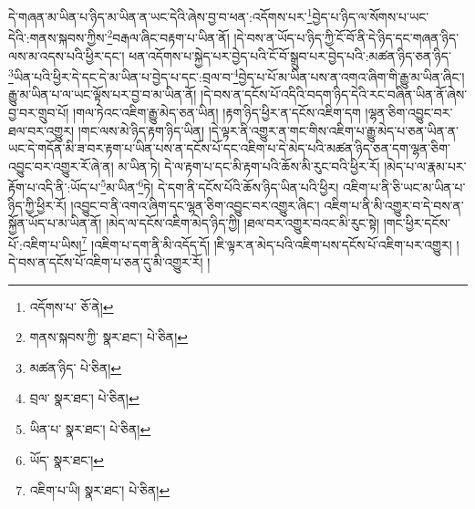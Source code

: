 དེ་གཞན་མ་ཡིན་པ་ཉིད་མ་ཡིན་ན་ཡང་དེའི་ཞེས་བྱ་བ་ཕན་:འདོགས་པར་\footnote{འདོགས་པ་  ཅོ་ནེ། }བྱེད་པ་ཉིད་ལ་སོགས་པ་ཡང་དེའི་:གནས་སྐབས་ཀྱིས་\footnote{གནས་སྐབས་ཀྱི་  སྣར་ཐང་།  པེ་ཅིན། }བརྒལ་ཞིང་བརྟག་པ་ཡིན་ནོ། །དེ་བས་ན་ཡོད་པ་ཉིད་ཀྱི་ངོ་བོ་ནི་དེ་ཉིད་དང་གཞན་ཉིད་ལས་མ་འདས་པའི་ཕྱིར་དང་། ཕན་འདོགས་པ་སྐྱེད་པར་བྱེད་པའི་ངོ་བོ་སྒྲུབ་པར་བྱེད་པའི་:མཚན་ཉིད་ཅན་ཉིད་\footnote{མཚན་ཉིད་  པེ་ཅིན། }ཡིན་པའི་ཕྱིར་དེ་དང་དེ་མ་ཡིན་པ་བྱེད་པ་དང་:བྲལ་བ་\footnote{བྲལ་  སྣར་ཐང་།  པེ་ཅིན། }བྱེད་པ་པོ་མ་ཡིན་པས་ན་འགའ་ཞིག་གི་རྒྱུ་མ་ཡིན་ཞིང་། རྒྱུ་མ་ཡིན་པ་ལ་ཡང་ལྟོས་པར་བྱ་བ་མ་ཡིན་ནོ། །དེ་བས་ན་དངོས་པོ་འདིའི་བདག་ཉིད་དེའི་རང་བཞིན་ཡིན་ནོ་ཞེས་བྱ་བར་གྲུབ་པོ། །གལ་ཏེའང་འཇིག་རྒྱུ་མེད་ཅན་ཡིན། །རྟག་ཉིད་ཕྱིར་ན་དངོས་འཇིག་དག །ལྷན་ཅིག་འབྱུང་བར་ཐལ་བར་འགྱུར། །གང་ལས་མེ་ཉིད་རྟག་ཉིད་ཡིན། །དེ་ལྟར་ནི་འགྱུར་ན་གང་གིས་འཇིག་པ་རྒྱུ་མེད་པ་ཅན་ཡིན་ན་ཡང་དེ་གདོན་མི་ཟ་བར་རྟག་པ་ཡིན་པས་ན་དངོས་པོ་དང་འཇིག་པ་དེ་མེད་པའི་མཚན་ཉིད་ཅན་དག་ལྷན་ཅིག་འབྱུང་བར་འགྱུར་རོ་ཞེ་ན། མ་ཡིན་ཏེ། དེ་ལ་རྟག་པ་དང་མི་རྟག་པའི་ཆོས་མི་རུང་བའི་ཕྱིར་རོ། །མེད་པ་ལ་རྣམ་པར་རྟོག་པ་འདི་ནི་:ཡོད་པ་\footnote{ཡིན་པ་  སྣར་ཐང་།  པེ་ཅིན། }མ་ཡིན་\footnote{ཡོད་  སྣར་ཐང་། }ཏེ། དེ་དག་ནི་དངོས་པོའི་ཆོས་ཉིད་ཡིན་པའི་ཕྱིར། འཇིག་པ་ནི་ཅི་ཡང་མ་ཡིན་པ་ཉིད་ཀྱི་ཕྱིར་རོ། །འབྱུང་བ་ནི་འགའ་ཞིག་དང་ལྷན་ཅིག་འབྱུང་བར་འགྱུར་ཞིང་། འཇིག་པ་ནི་མི་འགྱུར་བ་དེ་བས་ན་སྐྱོན་ཡོད་པ་མ་ཡིན་ནོ། །མེད་ལ་དངོས་འཇིག་མེད་ཉིད་ཀྱི། །ཐལ་བར་འགྱུར་བའང་མི་རུང་སྟེ། །གང་ཕྱིར་དངོས་པོ་:འཇིག་པ་ཡིས།\footnote{འཇིག་པ་ཡི།  སྣར་ཐང་།  པེ་ཅིན། } །འཇིག་པ་དག་ནི་མི་འདོད་དོ། །ཇི་ལྟར་ན་མེད་པའི་འཇིག་པས་དངོས་པོ་འཇིག་པར་འགྱུར། །དེ་བས་ན་དངོས་པོ་འཇིག་པ་ཅན་དུ་མི་འགྱུར་རོ། །
